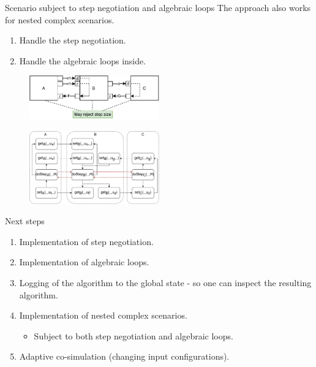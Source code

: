 \documentclass{beamer}
\begin{document}
\begin{frame}{Scenario subject to step negotiation and algebraic loops}
    The approach also works for nested complex scenarios.
    \begin{enumerate}
        \item Handle the step negotiation.
        \item Handle the algebraic loops inside.
    \end{enumerate}

    \begin{figure}    
        \includegraphics[width=0.5\textwidth]{images/loop_within_loop.pdf}
    \end{figure}
    \begin{figure}   
        \includegraphics[width=0.5\textwidth]{images/nested_graph.pdf}
    \end{figure}
\end{frame}

\begin{frame}{Next steps}
    \begin{enumerate}
        \item Implementation of step negotiation.
        \item Implementation of algebraic loops.
        \item Logging of the algorithm to the global state - so one can inspect the resulting algorithm.
        \item Implementation of nested complex scenarios.
        \begin{itemize}
            \item Subject to both step negotiation and algebraic loops.
        \end{itemize}
        \item Adaptive co-simulation (changing input configurations).
    \end{enumerate}  
\end{frame}
\end{document}
